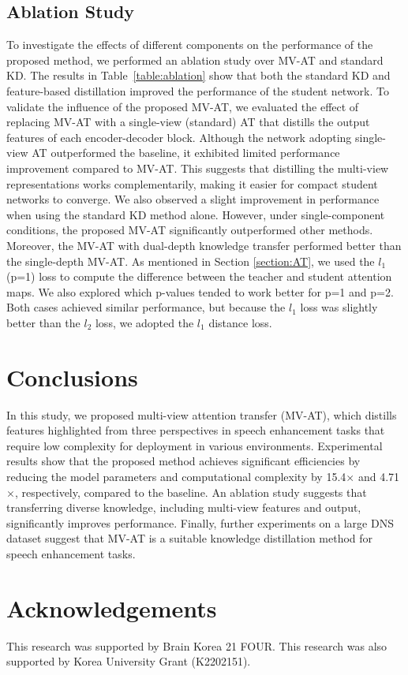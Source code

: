 \documentclass[a4paper]{article}
\begin{document}
\subsection{Ablation Study} \label{section_ablation}
To investigate the effects of different components on the performance of the proposed method, we performed an ablation study over MV-AT and standard KD. The results in Table~\ref{table:ablation} show that both the standard KD and feature-based distillation improved the performance of the student network. To validate the influence of the proposed MV-AT, we evaluated the effect of replacing MV-AT with a single-view (standard) AT that distills the output features of each encoder-decoder block. Although the network adopting single-view AT outperformed the baseline, it exhibited limited performance improvement compared to MV-AT. This suggests that distilling the multi-view representations works complementarily, making it easier for compact student networks to converge. We also observed a slight improvement in performance when using the standard KD method alone. However, under single-component conditions, the proposed MV-AT significantly outperformed other methods. Moreover, the MV-AT with dual-depth knowledge transfer performed better than the single-depth MV-AT. As mentioned in Section \ref{section:AT}, we used the $l_1$ (p=1) loss to compute the difference between the teacher and student attention maps. We also explored which p-values tended to work better for p=1 and p=2. Both cases achieved similar performance, but because the $l_1$ loss was slightly better than the $l_2$ loss, we adopted the $l_1$ distance loss.
\section{Conclusions}
In this study, we proposed multi-view attention transfer (MV-AT), which distills features highlighted from three perspectives in speech enhancement tasks that require low complexity for deployment in various environments. Experimental results show that the proposed method achieves significant efficiencies by reducing the model parameters and computational complexity by 15.4$\times$ and 4.71$\times$, respectively, compared to the baseline. An ablation study suggests that transferring diverse knowledge, including multi-view features and output, significantly improves performance. Finally, further experiments on a large DNS dataset suggest that MV-AT is a suitable knowledge distillation method for speech enhancement tasks.
\section{Acknowledgements}
This research was supported by Brain Korea 21 FOUR. This research was also supported by Korea University Grant (K2202151).




\end{document}
